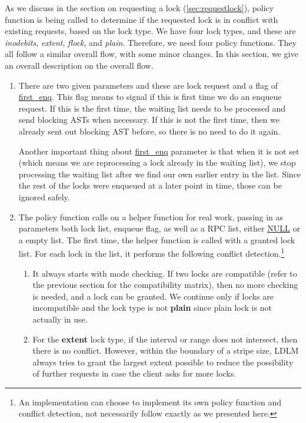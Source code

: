 As we discuss in the section on requesting a lock (\ref{sec:requestlock}),
policy function is being called to determine if the requested lock is in
conflict with existing requests, based on the lock type. We have four lock
types, and these are \textit{inodebits}, \textit{extent}, \textit{flock}, and
\textit{plain}. Therefore, we need four policy functions. They all follow a
similar overall flow, with some minor changes.  In this section, we give
an overall description on the overall flow.

\begin{enumerate}

\item There are two given parameters and these are lock request and a flag of
\url{first_enq}. This flag means to signal if this is first time we do an
enqueue request. If this is the first time, the waiting list needs to be processed
and send blocking ASTs when necessary. If this is not the first time, then we
already sent out blocking AST before, so there is no need to do it again.

Another important thing about \url{first_enq} parameter is that when it is not set
(which means we are reprocessing a lock already in the waiting list),
we stop processing the waiting list after we find our own earlier entry in the
list. Since the rest of the locks were enqueued at a later point in time, those
can be ignored safely.


\item \label{lm:helper} The policy function calls on a helper function for
real work, passing in as parameters both lock list, enqueue flag, as well as a
RPC list, either \url{NULL} or a empty list. The first time, the helper
function is called with a granted lock list. For each lock in the list, it
performs the following conflict detection.\footnote{An implementation can
choose to implement its own policy function and conflict detection, not
necessarily follow exactly as we presented here.}

  \begin{enumerate}

  \item It always starts with mode checking. If two locks are compatible (refer
  	to the previous section for the compatibility matrix), then no more checking is
  	needed, and a lock can be granted. We continue only if locks are incompatible and the lock
  	type is not \textbf{plain} since plain lock is not actually in use.

  \item For the \textbf{extent} lock type, if the interval or range does not 
  	intersect, then there is no conflict. However, within the boundary of a stripe 
	size, LDLM always tries to grant the largest extent possible to reduce the 
	possibility of further requests in case the client asks for more locks.


\end{enumerate}
\end{enumerate}
